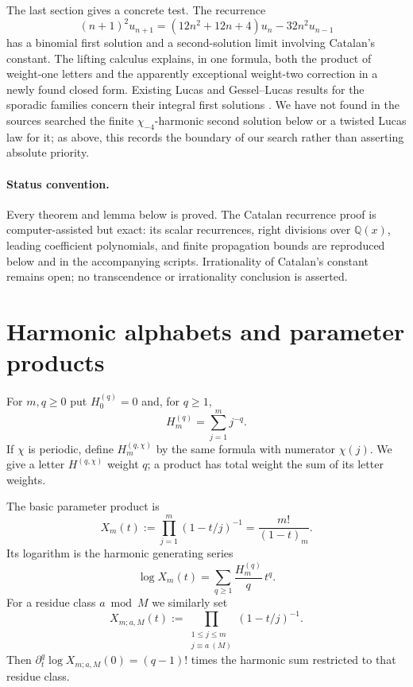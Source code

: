 \documentclass[11pt]{article}
\theoremstyle{definition}
\theoremstyle{remark}
\newcommand{\Q}{\mathbb Q}
\begin{document}
The last section gives a concrete test.  The recurrence
\begin{equation}\label{eq:Erec-intro}
 (n+1)^2u_{n+1}=(12n^2+12n+4)u_n-32n^2u_{n-1}
\end{equation}
has a binomial first solution and a second-solution limit involving Catalan's constant.
The lifting calculus explains, in one formula, both the product of weight-one letters and
the apparently exceptional weight-two correction in a newly found closed form.
Existing Lucas and Gessel--Lucas results for the sporadic families concern their integral
first solutions \cite{MalikStraub,StraubGessel}.  We have not found in the sources
searched the finite $\chi_{-4}$-harmonic second solution below or a twisted Lucas law for
it; as above, this records the boundary of our search rather than asserting absolute
priority.

\paragraph{Status convention.}
Every theorem and lemma below is proved.  The Catalan recurrence proof is
computer-assisted but exact: its scalar recurrences, right divisions over $\Q(x)$,
leading coefficient polynomials, and finite propagation bounds are reproduced below and
in the accompanying scripts.  Irrationality of Catalan's constant remains open; no
transcendence or irrationality conclusion is asserted.

\section{Harmonic alphabets and parameter products}

For $m,q\ge0$ put $H_0^{(q)}=0$ and, for $q\ge1$,
\[
 H_m^{(q)}=\sum_{j=1}^m j^{-q}.
\]
If $\chi$ is periodic, define $H_m^{(q,\chi)}$ by the same formula with numerator
$\chi(j)$.  We give a letter $H^{(q,\chi)}$ weight $q$; a product has total weight the sum
of its letter weights.

The basic parameter product is
\begin{equation}\label{eq:Xdef}
 X_m(t):=\prod_{j=1}^m(1-t/j)^{-1}=\frac{m!}{(1-t)_m}.
\end{equation}
Its logarithm is the harmonic generating series
\begin{equation}\label{eq:logX}
 \log X_m(t)=\sum_{q\ge1}\frac{H_m^{(q)}}q\,t^q.
\end{equation}
For a residue class $a\bmod M$ we similarly set
\begin{equation}\label{eq:Xres}
 X_{m;a,M}(t):=
 \prod_{\substack{1\le j\le m\\j\equiv a\ (M)}}(1-t/j)^{-1}.
\end{equation}
Then $\partial_t^q\log X_{m;a,M}(0)=(q-1)!$ times the harmonic sum restricted to that
residue class.
\end{document}
